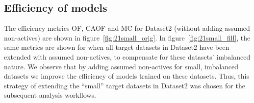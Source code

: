 \documentclass[utf8]{frontiersSCNS} %
\begin{document}
\subsection{Efficiency of models}
The efficiency metrics OF, CAOF and MC for Dataset2 (without adding assumed
non-actives) are shown in figure~\ref{fig:21small_orig}. In
figure~\ref{fig:21small_fill}, the same metrics are shown for when all target
datasets in Dataset2 have been extended with assumed non-actives, to compensate
for these datasets' imbalanced nature.
We observe that by adding assumed non-actives for small, imbalanced datasets we
improve the efficiency of models trained on these datasets. Thus, this strategy
of extending the ``small'' target datasets in Dataset2 was chosen for the
subsequent analysis workflows.
\end{document}
